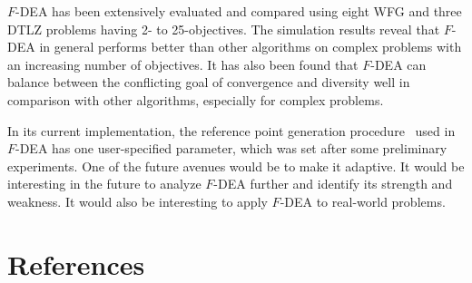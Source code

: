 \documentclass[review]{elsarticle}
\begin{document}
$F$-DEA has been extensively evaluated and compared using eight WFG and three DTLZ problems having 2- to 25-objectives. %
The simulation results reveal that $F$-DEA in general performs better than other algorithms on complex problems with an increasing number of objectives. 
It has also been found that $F$-DEA can balance between the conflicting goal of convergence and diversity well in comparison with other algorithms, especially for complex problems.

In its current implementation, the reference point generation procedure~\citep{das1998normal} used in $F$-DEA has one user-specified parameter, which was set after some preliminary experiments. One of the future avenues would be to make it adaptive. It would be interesting in the future to analyze $F$-DEA further and identify its strength and weakness. It would also be interesting to apply $F$-DEA to real-world problems. %

\section*{References}


\end{document}
